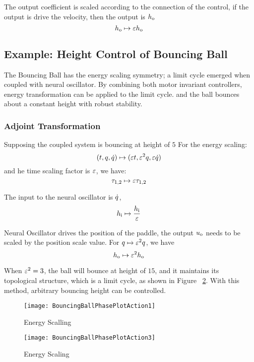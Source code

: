 The output coefficient is scaled according to the connection of the control, 
if the output is drive the velocity, then the output is $h_{\mathrm{o}}$
\[
h_{\mathrm{o}} \mapsto \varepsilon h_{\mathrm{o}}
\]




\subsection{Example: Height Control of Bouncing Ball}

The Bouncing Ball has the energy scaling symmetry; a limit cycle emerged when coupled with neural oscillator.
By combining both motor invariant controllers, energy transformation can be applied to the limit cycle.
and the ball  bounces about a constant height with robust stability.

\subsubsection*{Adjoint Transformation}
Supposing the coupled system is bouncing at height of $5$
For the energy scaling:
\[
(t,q,\dot{q} ) \mapsto ( \varepsilon t ,\varepsilon^2 q,\varepsilon \dot{q})
\]
and he time scaling factor is $\varepsilon$, we have:
\[
\tau_{1,2} \mapsto \varepsilon \tau_{1,2}
\]

The input to the neural oscillator is $\dot{q}$,
\[
h_{\mathrm{i}} \mapsto \frac{h_{\mathrm{i}}}{\varepsilon}
\]
 
Neural Oscillator drives the position of the paddle, the output $u_{\mathrm{o}}$ needs to be scaled by the position scale value.
For $q \mapsto \varepsilon^2q$, we have
\[
 h_{\mathrm{o}} \mapsto \varepsilon^2 h_{\mathrm{o}}
\]

When $\varepsilon^2=3$,  the ball will bounce at height of $15$, and it maintains its topological structure, which is a limit cycle, as shown in Figure ~\ref{fig:energy3}. 
With this method, arbitrary bouncing height can be controlled.


\begin{figure}[!htbp]
  \begin{center}
   	\texttt{[image: BouncingBallPhasePlotAction1]}
    \caption{Energy Scalling}
    \label{fig:energy1}
  \end{center}
\end{figure} 


\begin{figure}[!htbp]
  \begin{center}
	\texttt{[image: BouncingBallPhasePlotAction3]}
    \caption{Energy Scaling}
    \label{fig:energy3}
  \end{center}
\end{figure}

